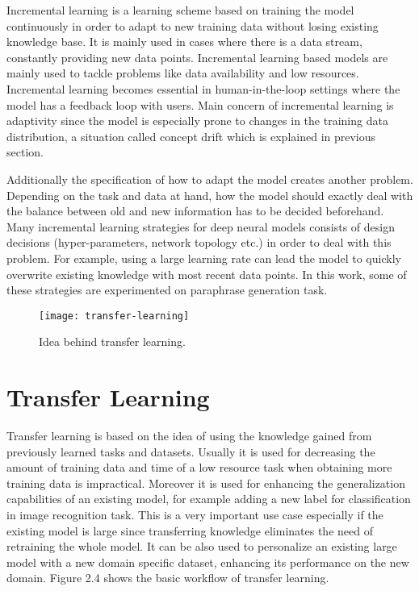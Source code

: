 Incremental learning is a learning scheme based on training the model continuously in order to adapt to new training data without losing existing knowledge base. It is mainly used in cases where there is a data stream, constantly providing new data points. Incremental learning based models are mainly used to tackle problems like data availability and low resources. Incremental learning becomes essential in human-in-the-loop settings where the model has a feedback loop with users. Main concern of incremental learning is adaptivity since the model is especially prone to changes in the training data distribution, a situation called concept drift which is explained in previous section. 

Additionally the specification of how to adapt the model creates another problem. Depending on the task and data at hand, how the model should exactly deal with the balance between old and new information has to be decided beforehand. Many incremental learning strategies for deep neural models consists of design decisions (hyper-parameters, network topology etc.) in order to deal with this problem. For example, using a large learning rate can lead the model to quickly overwrite existing knowledge with most recent data points. In this work, some of these strategies are experimented on paraphrase generation task.

\begin{figure}[t]
\texttt{[image: transfer-learning]}
\centering
\caption{Idea behind transfer learning.}
\end{figure}

\section{Transfer Learning}

Transfer learning is based on the idea of using the knowledge gained from previously learned tasks and datasets. Usually it is used for decreasing the amount of training data and time of a low resource task when obtaining more training data is impractical. Moreover it is used for enhancing the generalization capabilities of an existing model, for example adding a new label for classification in image recognition task. This is a very important use case especially if the existing model is large since transferring knowledge eliminates the need of retraining the whole model. It can be also used to personalize an existing large model with a new domain specific dataset, enhancing its performance on the new domain. Figure 2.4 shows the basic workflow of transfer learning.


